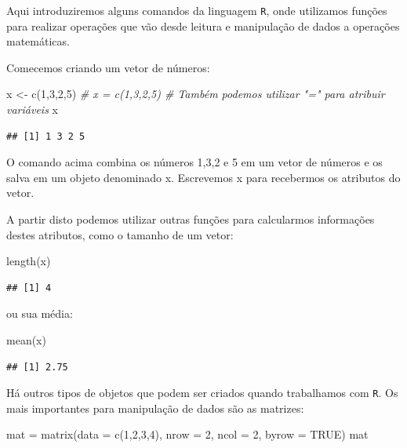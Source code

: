 \documentclass[
]{book}
\newenvironment{Shaded}{\begin{snugshade}}{\end{snugshade}}
\newcommand{\AttributeTok}[1]{\textcolor[rgb]{0.77,0.63,0.00}{#1}}
\newcommand{\CommentTok}[1]{\textcolor[rgb]{0.56,0.35,0.01}{\textit{#1}}}
\newcommand{\ConstantTok}[1]{\textcolor[rgb]{0.00,0.00,0.00}{#1}}
\newcommand{\DecValTok}[1]{\textcolor[rgb]{0.00,0.00,0.81}{#1}}
\newcommand{\FunctionTok}[1]{\textcolor[rgb]{0.00,0.00,0.00}{#1}}
\newcommand{\NormalTok}[1]{#1}
\newcommand{\OtherTok}[1]{\textcolor[rgb]{0.56,0.35,0.01}{#1}}
\begin{document}
Aqui introduziremos alguns comandos da linguagem \texttt{R}, onde utilizamos funções para realizar operações que vão desde leitura e manipulação de dados a operações matemáticas.

Comecemos criando um vetor de números:

\begin{Shaded}
\begin{Highlighting}[]
\NormalTok{x }\OtherTok{\textless{}{-}} \FunctionTok{c}\NormalTok{(}\DecValTok{1}\NormalTok{,}\DecValTok{3}\NormalTok{,}\DecValTok{2}\NormalTok{,}\DecValTok{5}\NormalTok{)}
\CommentTok{\# x = c(1,3,2,5) \# Também podemos utilizar "=" para atribuir variáveis}
\NormalTok{x}
\end{Highlighting}
\end{Shaded}

\begin{verbatim}
## [1] 1 3 2 5
\end{verbatim}

O comando acima combina os números 1,3,2 e 5 em um vetor de números e os salva em um objeto denominado x. Escrevemos x para recebermos os atributos do vetor.

A partir disto podemos utilizar outras funções para calcularmos informações destes atributos, como o tamanho de um vetor:

\begin{Shaded}
\begin{Highlighting}[]
\FunctionTok{length}\NormalTok{(x)}
\end{Highlighting}
\end{Shaded}

\begin{verbatim}
## [1] 4
\end{verbatim}

ou sua média:

\begin{Shaded}
\begin{Highlighting}[]
\FunctionTok{mean}\NormalTok{(x)}
\end{Highlighting}
\end{Shaded}

\begin{verbatim}
## [1] 2.75
\end{verbatim}

Há outros tipos de objetos que podem ser criados quando trabalhamos com \texttt{R}. Os mais importantes para manipulação de dados são as matrizes:

\begin{Shaded}
\begin{Highlighting}[]
\NormalTok{mat }\OtherTok{=} \FunctionTok{matrix}\NormalTok{(}\AttributeTok{data =} \FunctionTok{c}\NormalTok{(}\DecValTok{1}\NormalTok{,}\DecValTok{2}\NormalTok{,}\DecValTok{3}\NormalTok{,}\DecValTok{4}\NormalTok{), }\AttributeTok{nrow =} \DecValTok{2}\NormalTok{, }\AttributeTok{ncol =} \DecValTok{2}\NormalTok{,}
           \AttributeTok{byrow =} \ConstantTok{TRUE}\NormalTok{)}
\NormalTok{mat}
\end{Highlighting}
\end{Shaded}
\end{document}
